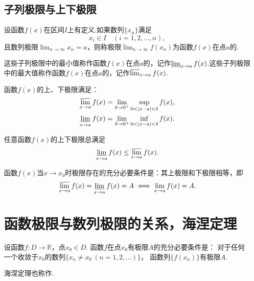 \subsection{子列极限与上下极限}
\begin{definition}\label{definition:极限.函数的子列极限和上下极限}
设函数\(f(x)\)在区间\(I\)上有定义.如果数列\(\{x_n\}\)满足\[
x_i \in I \quad (i=1,2,\dotsc,n),
\]且数列极限\(\lim_{n\to\infty}{x_n} = a\)，则称极限\(\lim_{n\to\infty}{f(x_n)}\)为函数\(f(x)\)在点\(a\)的.

这些子列极限中的最小值称作函数\(f(x)\)在点\(a\)的，记作\(\varliminf_{x \to a}f(x)\).这些子列极限中的最大值称作函数\(f(x)\)在点\(a\)的，记作\(\varlimsup_{x \to a}f(x)\).
\end{definition}

\begin{property}
函数\(f(x)\)的上、下极限满足：\begin{gather}
\varlimsup_{x \to a} f(x) = \lim_{\delta\to0^+} \sup_{0<\abs{x-a}<\delta} f(x), \\
\varliminf_{x \to a} f(x) = \lim_{\delta\to0^+} \inf_{0<\abs{x-a}<\delta} f(x).
\end{gather}
\end{property}

\begin{theorem}
任意函数\(f(x)\)的上下极限总满足\[
\varliminf_{x \to a} f(x) \leq \varlimsup_{x \to a} f(x).
\]
\end{theorem}

\begin{theorem}
函数\(f(x)\)当\(x \to x_0\)时极限存在的充分必要条件是：其上极限和下极限相等，即\[
\varlimsup_{x \to a} f(x) = \varliminf_{x \to a} f(x) = A
\iff
\lim_{x \to a} f(x) = A.
\]
\end{theorem}

\section{函数极限与数列极限的关系，海涅定理}
\begin{theorem}[海涅定理]\label{theorem:极限.海涅定理}
设函数\(f\colon D\to\mathbb{R}\)，点\(x_0 \in D\).
函数\(f\)在点\(x_0\)有极限\(A\)的充分必要条件是：
对于任何一个收敛于\(x_0\)的数列\(\{x_n \neq x_0\ (n=1,2,\dotsc)\}\)，
函数列\(\{f(x_n)\}\)有极限\(A\).
\end{theorem}
海涅定理也称作.

